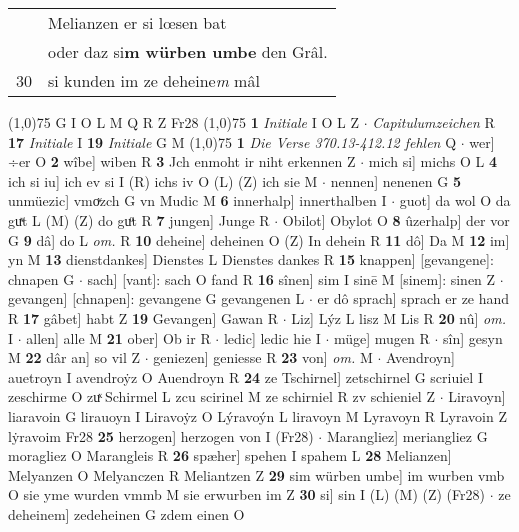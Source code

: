 \documentclass[8pt,a4paper,notitlepage]{article}
\begin{document}
\begin{table}[ht]
\begin{minipage}[t]{0.5\linewidth}
\begin{tabular}{rl}
 & Melianzen er si lœsen bat\\ 
 & oder daz si\textbf{m würben umbe} den Grâl.\\ 
30 & si kunden im ze deheine\textit{m} mâl\\ 
\end{tabular}
\scriptsize
\line(1,0){75} \newline
G I O L M Q R Z Fr28 \newline
\line(1,0){75} \newline
\textbf{1} \textit{Initiale} I O L Z   $\cdot$ \textit{Capitulumzeichen} R  \textbf{17} \textit{Initiale} I  \textbf{19} \textit{Initiale} G M  \newline
\line(1,0){75} \newline
\textbf{1} \textit{Die Verse 370.13-412.12 fehlen} Q   $\cdot$ wer] ÷er O \textbf{2} wîbe] wiben R \textbf{3} Jch enmoht ir niht erkennen Z  $\cdot$ mich si] michs O L \textbf{4} ich si iu] ich ev si I (R) ichs iv O (L) (Z) ich sie M  $\cdot$ nennen] nenenen G \textbf{5} unmüezic] vmoͮzch G vn Mudic M \textbf{6} innerhalp] innerthalben I  $\cdot$ guot] da wol O da guͯt L (M) (Z) do guͦt R \textbf{7} jungen] Junge R  $\cdot$ Obilot] Obylot O \textbf{8} ûzerhalp] der vor G \textbf{9} dâ] do L \textit{om.} R \textbf{10} deheine] deheinen O (Z) In dehein R \textbf{11} dô] Da M \textbf{12} im] yn M \textbf{13} dienstdankes] Dienstes L Dienstes dankes R \textbf{15} knappen] [gevangene]: chnapen G  $\cdot$ sach] [vant]: sach O fand R \textbf{16} sînen] sim I sinē M [sinem]: sinen Z  $\cdot$ gevangen] [chnapen]: gevangene G gevangenen L  $\cdot$ er dô sprach] sprach er ze hand R \textbf{17} gâbet] habt Z \textbf{19} Gevangen] Gawan R  $\cdot$ Liz] Lýz L lisz M Lis R \textbf{20} nû] \textit{om.} I  $\cdot$ allen] alle M \textbf{21} ober] Ob ir R  $\cdot$ ledic] ledic hie I  $\cdot$ müge] mugen R  $\cdot$ sîn] gesyn M \textbf{22} dâr an] so vil Z  $\cdot$ geniezen] geniesse R \textbf{23} von] \textit{om.} M  $\cdot$ Avendroyn] auetroyn I avendroẏz O Auendroyn R \textbf{24} ze Tschirnel] zetschirnel G scriuiel I zeschirme O zuͯ Schirmel L zcu scirinel M ze schirniel R zv schieniel Z  $\cdot$ Liravoyn] liaravoin G lirauoyn I Liravoẏz O Lýravoýn L liravoyn M Lyravoyn R Lyravoin Z lẏravoim Fr28 \textbf{25} herzogen] herzogen von I (Fr28)  $\cdot$ Marangliez] meriangliez G moragliez O Marangleis R \textbf{26} spæher] spehen I spahem L \textbf{28} Melianzen] Melyanzen O Melyanczen R Meliantzen Z \textbf{29} sim würben umbe] im wurben vmb O sie yme wurden vmmb M sie erwurben im Z \textbf{30} si] sin I (L) (M) (Z) (Fr28)  $\cdot$ ze deheinem] zedeheinen G zdem einen O \newline

\end{minipage}
\end{table}
\end{document}
